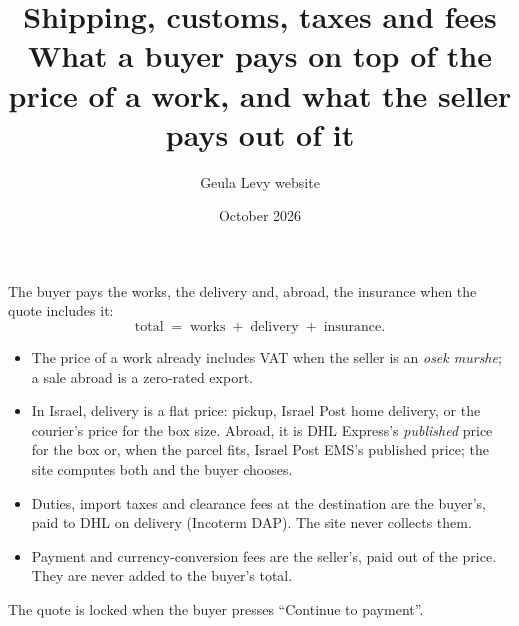 \documentclass[11pt,a4paper]{article}
\title{\textbf{Shipping, customs, taxes and fees}\\[4pt]\large What a buyer pays on top of the
  price of a work, and what the seller pays out of it}
\author{Geula Levy website}
\date{October 2026}
\begin{document}
\maketitle

\begin{tcolorbox}[colback=lake!6,colframe=lake,title=\textbf{The rule},fonttitle=\sffamily]
The buyer pays the works, the delivery and, abroad, the insurance when the quote includes it:
\[
  \text{total} \;=\; \text{works} \;+\; \text{delivery} \;+\; \text{insurance}.
\]
\begin{itemize}[leftmargin=*]
  \item The price of a work already includes VAT when the seller is an \emph{osek murshe}; a sale
    abroad is a zero-rated export.
  \item In Israel, delivery is a flat price: pickup, Israel Post home delivery, or the courier's
    price for the box size. Abroad, it is DHL Express's
    \emph{published} price for the box or, when the parcel fits, Israel Post EMS's published price;
    the site computes both and the buyer chooses.
  \item Duties, import taxes and clearance fees at the destination are the buyer's, paid to DHL on
    delivery (Incoterm DAP). The site never collects them.
  \item Payment and currency-conversion fees are the seller's, paid out of the price. They are
    never added to the buyer's total.
\end{itemize}
The quote is locked when the buyer presses ``Continue to payment''.
\end{tcolorbox}
\end{document}
